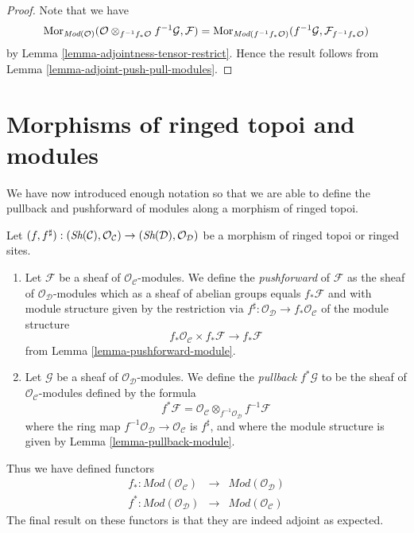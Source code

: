 \begin{proof}
Note that we have
$$
\mathop{\rm Mor}\nolimits_{\textit{Mod}(\mathcal{O})}(
\mathcal{O} \otimes_{f^{-1}f_*\mathcal{O}} f^{-1}\mathcal{G}, \mathcal{F})
=
\mathop{\rm Mor}\nolimits_{\textit{Mod}(f^{-1}f_*\mathcal{O})}(
f^{-1}\mathcal{G}, \mathcal{F}_{f^{-1}f_*\mathcal{O}})
$$
by Lemma \ref{lemma-adjointness-tensor-restrict}. Hence the result follows
from Lemma \ref{lemma-adjoint-push-pull-modules}.
\end{proof}






\section{Morphisms of ringed topoi and modules}
\label{section-functoriality-modules}

\noindent
We have now introduced enough notation so that we are able to
define the pullback and pushforward of modules along a morphism
of ringed topoi.

\begin{definition}
\label{definition-pushforward}
Let
$(f, f^\sharp) :
(\mathop{\textit{Sh}}\nolimits(\mathcal{C}), \mathcal{O}_\mathcal{C})
\to
(\mathop{\textit{Sh}}\nolimits(\mathcal{D}), \mathcal{O}_\mathcal{D})$
be a morphism of ringed topoi or ringed sites.
\begin{enumerate}
\item Let $\mathcal{F}$ be a sheaf of $\mathcal{O}_\mathcal{C}$-modules.
We define the {\it pushforward} of $\mathcal{F}$ as the
sheaf of $\mathcal{O}_\mathcal{D}$-modules which as a sheaf
of abelian groups equals $f_*\mathcal{F}$ and with
module structure given by the restriction
via $f^\sharp : \mathcal{O}_\mathcal{D} \to f_*\mathcal{O}_\mathcal{C}$
of the module structure
$$
f_*\mathcal{O}_\mathcal{C} \times f_*\mathcal{F}
\longrightarrow
f_*\mathcal{F}
$$
from Lemma \ref{lemma-pushforward-module}.
\item Let $\mathcal{G}$ be a sheaf of $\mathcal{O}_\mathcal{D}$-modules.
We define the {\it pullback} $f^*\mathcal{G}$ to be the
sheaf of $\mathcal{O}_\mathcal{C}$-modules defined by the formula
$$
f^*\mathcal{F}
=
\mathcal{O}_\mathcal{C} \otimes_{f^{-1}\mathcal{O}_\mathcal{D}}
f^{-1}\mathcal{F}
$$
where the ring map
$f^{-1}\mathcal{O}_\mathcal{D} \to \mathcal{O}_\mathcal{C}$
is $f^\sharp$, and where the  module
structure is given by Lemma \ref{lemma-pullback-module}.
\end{enumerate}
\end{definition}

\noindent
Thus we have defined functors
\begin{eqnarray*}
f_* : \textit{Mod}(\mathcal{O}_\mathcal{C})
& \longrightarrow &
\textit{Mod}(\mathcal{O}_\mathcal{D}) \\
f^* : \textit{Mod}(\mathcal{O}_\mathcal{D})
& \longrightarrow &
\textit{Mod}(\mathcal{O}_\mathcal{C})
\end{eqnarray*}
The final result on these functors is that they are indeed
adjoint as expected.

